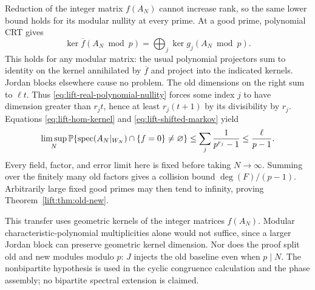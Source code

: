Reduction of the integer matrix $f(A_N)$ cannot increase rank,
so the same lower bound holds for its modular nullity at every
prime. At a good prime, polynomial CRT gives
\begin{equation}\label{eq:lift-crt}
 \ker\overline f(A_N\bmod p)=
       \bigoplus_j\ker g_j(A_N\bmod p).
\end{equation}
This holds for any modular matrix: the usual polynomial projectors
sum to identity on the kernel annihilated by $\overline f$ and
project into the indicated kernels. Jordan blocks elsewhere cause
no problem. The old dimensions on the right sum to $\ell t$.
Thus \eqref{eq:lift-real-polynomial-nullity} forces some index $j$
to have dimension greater than $r_jt$, hence at least $r_j(t+1)$
by its divisibility by $r_j$. Equations
\eqref{eq:lift-hom-kernel} and \eqref{eq:lift-shifted-markov} yield
\[
 \limsup_N\mathbb P\{\operatorname{spec}(A_N|_{W_N})\cap\{f=0\}\ne\varnothing\}
 \le\sum_j\frac1{p^{r_j}-1}\le\frac\ell{p-1}.
\]
Every field, factor, and error limit here is fixed before taking
$N\to\infty$. Summing over the finitely many old factors gives
a collision bound $\deg(F)/(p-1)$. Arbitrarily large fixed good
primes may then tend to infinity, proving
Theorem~\ref{lift:thm:old-new}.

This transfer uses geometric kernels of the integer matrices
$f(A_N)$. Modular characteristic-polynomial multiplicities alone
would not suffice, since a larger Jordan block can preserve geometric
kernel dimension. Nor does the proof split old and new modules
modulo $p$: $J$ injects the old baseline even when $p\mid N$.
The nonbipartite hypothesis is used in the cyclic congruence calculation
and the phase assembly; no bipartite spectral extension is claimed.

